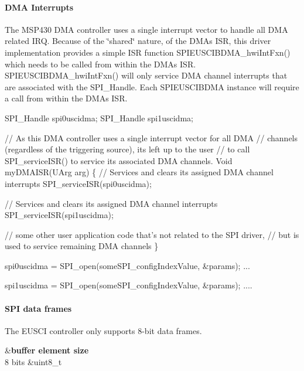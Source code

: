 \paragraph*{D\+M\+A Interrupts}

The M\+S\+P430 D\+M\+A controller uses a single interrupt vector to handle all D\+M\+A related I\+R\+Q. Because of the \char`\"{}shared\char`\"{} nature, of the D\+M\+A\textquotesingle{}s I\+S\+R, this driver implementation provides a simple I\+S\+R function S\+P\+I\+E\+U\+S\+C\+I\+B\+D\+M\+A\+\_\+hwi\+Int\+Fxn() which needs to be called from within the D\+M\+A\textquotesingle{}s I\+S\+R. S\+P\+I\+E\+U\+S\+C\+I\+B\+D\+M\+A\+\_\+hwi\+Int\+Fxn() will only service D\+M\+A channel interrupts that are associated with the S\+P\+I\+\_\+\+Handle. Each S\+P\+I\+E\+U\+S\+C\+I\+B\+D\+M\+A instance will require a call from within the D\+M\+A\textquotesingle{}s I\+S\+R.


\begin{DoxyCode}
SPI_Handle spi0uscidma;
SPI_Handle spi1uscidma;

\textcolor{comment}{// As this DMA controller uses a single interrupt vector for all DMA}
\textcolor{comment}{// channels (regardless of the triggering source), its left up to the user}
\textcolor{comment}{// to call SPI\_serviceISR() to service its associated DMA channels.}
Void myDMAISR(UArg arg)
\{
    \textcolor{comment}{// Services and clears its assigned DMA channel interrupts}
    SPI_serviceISR(spi0uscidma);

    \textcolor{comment}{// Services and clears its assigned DMA channel interrupts}
    SPI_serviceISR(spi1uscidma);

    \textcolor{comment}{// some other user application code that's not related to the SPI driver,}
    \textcolor{comment}{// but is used to service remaining DMA channels}
\}

spi0uscidma = SPI_open(someSPI\_configIndexValue, &params);
...

spi1uscidma = SPI_open(someSPI\_configIndexValue, &params);
....
\end{DoxyCode}


\paragraph*{S\+P\+I data frames}

The E\+U\+S\+C\+I controller only supports 8-\/bit data frames.

\begin{TabularC}{2}
\hline
{}&{\bf buffer element size  }\\
8 bits &uint8\+\_\+t \\
\end{TabularC}
